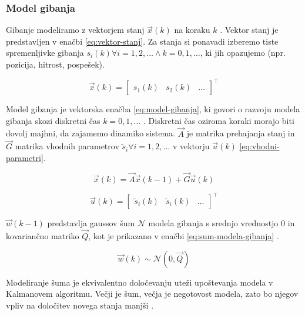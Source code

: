 \subsubsection{Model gibanja}
Gibanje modeliramo z vektorjem stanj $\vec{x}(k)$ na koraku $k$ \cite{trucco1998introductory}. Vektor stanj je predstavljen v enačbi \eqref{eq:vektor-stanj}. Za stanja si ponavadi izberemo tiste spremenljivke gibanja $s_i(k) \forall i = 1,2,\ldots \land k = 0, 1,\ldots$, ki jih opazujemo (npr. pozicija, hitrost, pospešek).

\begin{equation}
\vec{x}(k) = \begin{bmatrix}
					s_1(k) & s_2(k) & \ldots
\end{bmatrix}^\top
\label{eq:vektor-stanj} 
\end{equation}


Model gibanja je vektorska enačba \eqref{eq:model-gibanja}, ki govori o razvoju modela gibanja skozi diskretni čas $k = 0,1,\ldots$ \cite{trucco1998introductory}. Diskretni čas oziroma koraki morajo biti dovolj majhni, da zajamemo dinamiko sistema. $\vec{A}$ je matrika prehajanja stanj in $\vec{G}$ matrika vhodnih parametrov $\tilde{s}_i \forall i = 1,2,\ldots$ v vektorju $\vec{u}(k)$ \eqref{eq:vhodni-parametri}. 



\begin{equation}
\vec{x}(k) = \vec{A} \vec{x}(k-1) + \vec{G} \vec{u}(k)
\label{eq:model-gibanja}
\end{equation}

\begin{equation}
\vec{u}(k) = \begin{bmatrix}
					\tilde{s}_i(k) & \tilde{s}_i(k) & \ldots
			\end{bmatrix}^\top 
\label{eq:vhodni-parametri}
\end{equation}

$\vec{w}(k-1)$ predstavlja gaussov šum $\mathcal{N}$ modela gibanja s srednjo vrednostjo $0$ in kovariančno matriko $\vec{Q}$, kot je prikazano v enačbi \eqref{eq:sum-modela-gibanja} \cite{trucco1998introductory}.

\begin{equation}
 \vec{w}(k) \sim \mathcal{N}\left(0,\vec{Q}\right)
 \label{eq:sum-modela-gibanja}
\end{equation}

Modeliranje šuma je ekvivalentno določevanju uteži upoštevanja modela v Kalmanovem algoritmu. Večji je šum, večja je negotovost modela, zato bo njegov vpliv na določitev novega stanja manjši \cite{trucco1998introductory}.


